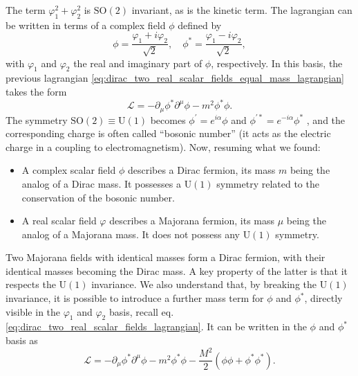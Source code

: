 The term \(\varphi_1^2 + \varphi_2^2 \) is \(\mathrm{SO}(2)\) invariant, as is the kinetic term. The lagrangian can be written in terms of a complex field \(\phi\) defined by
\begin{equation}
    \phi = \frac{\varphi_1 + i \varphi_2}{\sqrt{2}}, \quad \phi^* = \frac{\varphi_1 - i \varphi_2}{\sqrt{2}},
    \label{eq:dirac_complex_scalar_field_definition}
\end{equation}
with \(\varphi_1\) and \(\varphi_2\) the real and imaginary part of \(\phi\), respectively. In this basis, the previous lagrangian \eqref{eq:dirac_two_real_scalar_fields_equal_mass_lagrangian} takes the form
\begin{equation}
    \mathcal{L} = - \partial_\mu \phi^* \partial^\mu \phi - m^2 \phi^* \phi.
    \label{eq:dirac_complex_scalar_field_lagrangian}
\end{equation}
The symmetry \(\mathrm{SO}(2) \equiv \mathrm{U}(1)\) becomes \(\phi^{\prime} = e^{i \alpha} \phi\) and \(\phi^{\prime *} = e^{-i \alpha} \phi^*\) , and the corresponding charge is often called “bosonic number” (it acts as the electric charge in a coupling to electromagnetism).
Now, resuming what we found:
\begin{itemize}
    \item[(i)] A complex scalar field \(\phi\) describes a Dirac fermion, its mass \(m\) being the analog of a Dirac mass. It possesses a \(\mathrm{U}(1)\) symmetry related to the conservation of the bosonic number.
    \item[(ii)] A real scalar field \(\varphi\) describes a Majorana fermion, its mass \(\mu\) being the analog of a Majorana mass. It does not possess any \(\mathrm{U}(1)\) symmetry.
\end{itemize}
Two Majorana fields with identical masses form a Dirac fermion, with their identical masses becoming the Dirac mass. A key property of the latter is that it respects the \(\mathrm{U}(1)\) invariance. We also understand that, by breaking the \(\mathrm{U}(1)\) invariance, it is possible to introduce a further mass term for \(\phi\) and \(\phi^*\), directly visible in the \(\varphi_1\) and \(\varphi_2\) basis, recall eq. \eqref{eq:dirac_two_real_scalar_fields_lagrangian}. It can be written in the \(\phi\) and \(\phi^*\) basis as
\begin{equation}
    \mathcal{L} = -\partial_\mu \phi^* \partial^\mu \phi - m^2 \phi^* \phi - \frac{M^2}{2} (\phi \phi + \phi^{*} \phi^{*}).
    \label{eq:dirac_complex_scalar_field_majorana_mass}
\end{equation}
